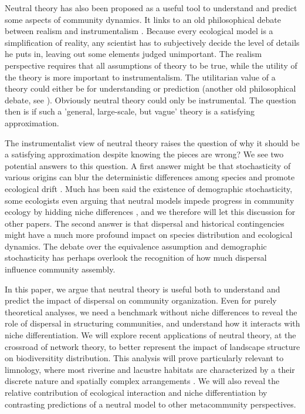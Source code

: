 \documentclass[12pt]{article}
\begin{document}
Neutral theory has also been proposed as a useful tool to understand and predict
some aspects of community dynamics. It links to an old philosophical debate
between realism and instrumentalism \parencite{Wennekes2011}. Because every
ecological model is a simplification of reality, any scientist has to
subjectively decide the level of details he puts in, leaving out some elements
judged unimportant. The realism perspective requires that all assumptions of
theory to be true, while the utility of the theory is more important to
instrumentalism. The utilitarian value of a theory could either be for
understanding or prediction (another old philosophical debate, see
\textcite{Schmueli2010}). Obviously neutral theory could only be instrumental.
The question then is if such a 'general, large-scale, but vague' theory
\parencite{Wennekes2011} is a satisfying approximation. 

The instrumentalist view of neutral theory raises the question of why it should
be a satisfying approximation despite knowing the pieces are wrong? We see two
potential answers to this question. A first answer might be that stochasticity
of various origins can blur the deterministic differences among species and
promote ecological drift \parencite{Gravel2011}. Much has been said the
existence of demographic stochasticity, some ecologists even arguing that
neutral models impede progress in community ecology by hidding niche differences
\parencite{Clark2012}, and we therefore will let this discussion for other
papers. The second answer is that dispersal and historical contingencies might
have a much more profound impact on species distribution \parencite{Bahn2007, Boulangeat2012}
and ecological dynamics. The debate over the equivalence assumption and
demographic stochasticity has perhaps overlook the recognition of how much
dispersal influence community assembly.

In this paper, we argue that neutral theory is useful both to understand and
predict the impact of dispersal on community organization. Even
for purely theoretical analyses, we need a benchmark without niche differences to
reveal the role of dispersal in structuring communities, and understand how it
interacts with niche differentiation. We will explore recent applications of
neutral theory, at the crossroad of network theory, to better represent the
impact of landscape structure on biodiversitity distribution. This analysis will
prove particularly relevant to limnology, where most riverine and lacustre
habitats are characterized by a their discrete nature and spatially complex
arrangements \parencite{Peterson2013}. We will also reveal the relative contribution of ecological
interaction and niche differentiation by contrasting predictions of a neutral
model to other metacommunity perspectives. 
\end{document}
